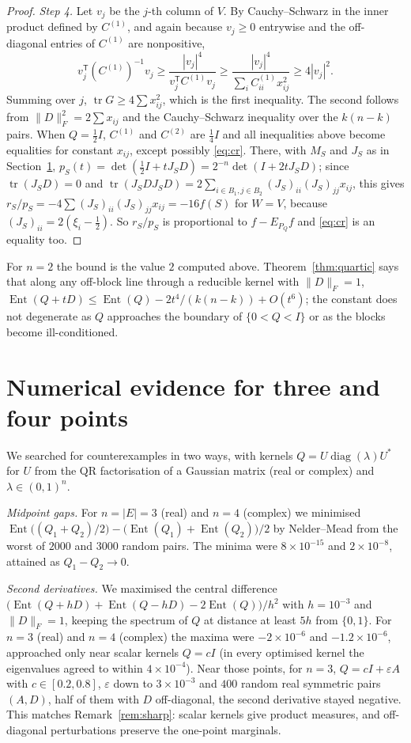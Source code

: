 \documentclass[11pt]{amsart}
\theoremstyle{remark}
\numberwithin{equation}{section}
\newcommand{\Ent}{\operatorname{Ent}}
\newcommand{\tr}{\operatorname{tr}}
\begin{document}
\begin{proof}
\emph{Step 4.} Let $v_j$ be the $j$-th column of $V$. By Cauchy--Schwarz in the inner product defined by $C^{(1)}$, and again because $v_j\ge0$ entrywise and the off-diagonal entries of $C^{(1)}$ are nonpositive,
\[
v_j^{\mathsf T}(C^{(1)})^{-1}v_j\ge\frac{|v_j|^4}{v_j^{\mathsf T}C^{(1)}v_j}\ge\frac{|v_j|^4}{\sum_iC^{(1)}_{ii}x_{ij}^2}\ge4|v_j|^2.
\]
Summing over $j$, $\tr G\ge4\sum x_{ij}^2$, which is the first inequality. The second follows from $\|D\|_F^2=2\sum x_{ij}$ and the Cauchy--Schwarz inequality over the $k(n-k)$ pairs. When $Q=\frac12I$, $C^{(1)}$ and $C^{(2)}$ are $\frac14I$ and all inequalities above become equalities for constant $x_{ij}$, except possibly \eqref{eq:cr}. There, with $M_S$ and $J_S$ as in Section~\ref{sec:numerics}, $p_S(t)=\det(\frac12I+tJ_SD)=2^{-n}\det(I+2tJ_SD)$; since $\tr(J_SD)=0$ and $\tr(J_SDJ_SD)=2\sum_{i\in B_1,j\in B_2}(J_S)_{ii}(J_S)_{jj}x_{ij}$, this gives $r_S/p_S=-4\sum(J_S)_{ii}(J_S)_{jj}x_{ij}=-16f(S)$ for $W=V$, because $(J_S)_{ii}=2(\xi_i-\frac12)$. So $r_S/p_S$ is proportional to $f-E_{P_Q}f$ and \eqref{eq:cr} is an equality too.
\end{proof}

For $n=2$ the bound is the value $2$ computed above. Theorem~\ref{thm:quartic} says that along any off-block line through a reducible kernel with $\|D\|_F=1$, $\Ent(Q+tD)\le\Ent(Q)-2t^4/(k(n-k))+O(t^6)$; the constant does not degenerate as $Q$ approaches the boundary of $\{0<Q<I\}$ or as the blocks become ill-conditioned.

\section{Numerical evidence for three and four points}\label{sec:numerics}

We searched for counterexamples in two ways, with kernels $Q=U\operatorname{diag}(\lambda)U^*$ for $U$ from the QR factorisation of a Gaussian matrix (real or complex) and $\lambda\in(0,1)^n$.

\emph{Midpoint gaps.} For $n=|E|=3$ (real) and $n=4$ (complex) we minimised $\Ent\bigl((Q_1+Q_2)/2\bigr)-\bigl(\Ent(Q_1)+\Ent(Q_2)\bigr)/2$ by Nelder--Mead from the worst of $2000$ and $3000$ random pairs. The minima were $8\times10^{-15}$ and $2\times10^{-8}$, attained as $Q_1-Q_2\to0$.

\emph{Second derivatives.} We maximised the central difference $\bigl(\Ent(Q+hD)+\Ent(Q-hD)-2\Ent(Q)\bigr)/h^2$ with $h=10^{-3}$ and $\|D\|_F=1$, keeping the spectrum of $Q$ at distance at least $5h$ from $\{0,1\}$. For $n=3$ (real) and $n=4$ (complex) the maxima were $-2\times10^{-6}$ and $-1.2\times10^{-6}$, approached only near scalar kernels $Q=cI$ (in every optimised kernel the eigenvalues agreed to within $4\times10^{-4}$). Near those points, for $n=3$, $Q=cI+\varepsilon A$ with $c\in[0.2,0.8]$, $\varepsilon$ down to $3\times10^{-3}$ and $400$ random real symmetric pairs $(A,D)$, half of them with $D$ off-diagonal, the second derivative stayed negative. This matches Remark~\ref{rem:sharp}: scalar kernels give product measures, and off-diagonal perturbations preserve the one-point marginals.
\end{document}
